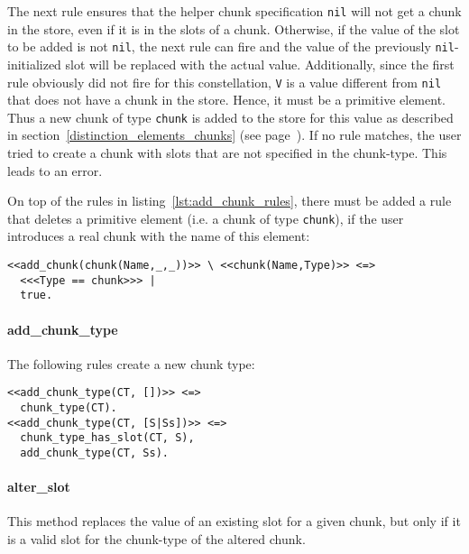 The next rule ensures that the helper chunk specification \lstinline|nil| will not get a chunk in the store, even if it is in the slots of a chunk. Otherwise, if the value of the slot to be added is not \lstinline|nil|, the next rule can fire and the value of the previously \lstinline|nil|-initialized slot will be replaced with the actual value. Additionally, since the first rule obviously did not fire for this constellation, \lstinline|V| is a value different from \lstinline|nil| that does not have a chunk in the store. Hence, it must be a primitive element. Thus a new chunk of type \lstinline|chunk| is added to the store for this value as described in section~\ref{distinction_elements_chunks} (see page~\pageref{distinction_elements_chunks}). If no rule matches, the user tried to create a chunk with slots that are not specified in the chunk-type. This leads to an error.

On top of the rules in listing~\ref{lst:add_chunk_rules}, there must be added a rule that deletes a primitive element (i.e. a chunk of type \lstinline|chunk|), if the user introduces a real chunk with the name of this element:

\begin{lstlisting}[caption={Clean up primitive elements}]  
% delete chunk of Type chunk, if real chunk is added
<<add_chunk(chunk(Name,_,_))>> \ <<chunk(Name,Type)>> <=> 
  <<<Type == chunk>>> |
  true.
\end{lstlisting}


\paragraph{add\_chunk\_type}

The following rules create a new chunk type:

\begin{lstlisting}[caption={rules for \texttt{add\_chunk\_type}}]
<<add_chunk_type(CT, [])>> <=> 
  chunk_type(CT).
<<add_chunk_type(CT, [S|Ss])>> <=> 
  chunk_type_has_slot(CT, S), 
  add_chunk_type(CT, Ss).
\end{lstlisting}

\paragraph{alter\_slot}

This method replaces the value of an existing slot for a given chunk, but only if it is a valid slot for the chunk-type of the altered chunk.

